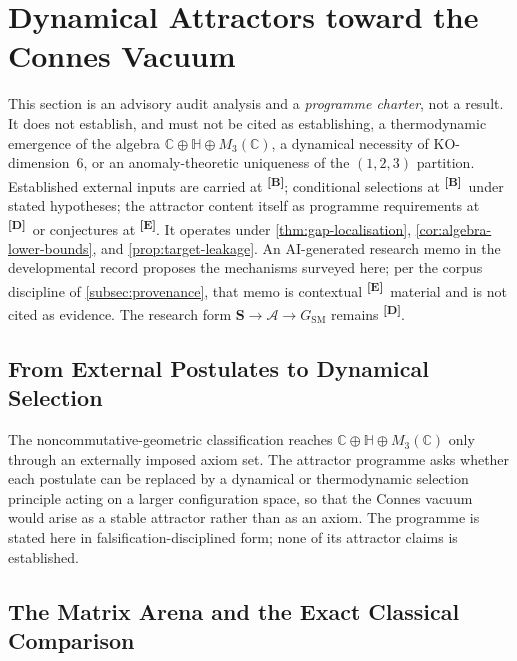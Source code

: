 \documentclass[12pt,a4paper,twoside]{article}
\theoremstyle{plain}
\theoremstyle{definition}
\theoremstyle{remark}
\newcommand{\catmark}[1]{\textsuperscript{\textsf{\textbf{[#1]}}}}
\begin{document}
\newpage
\section{Dynamical Attractors toward the Connes Vacuum}
\label{sec:connes-attractor}

\begin{governancebox}
This section is an advisory audit analysis and a \emph{programme
charter}, not a result. It does not establish, and must not be cited as
establishing, a thermodynamic emergence of the algebra
$\mathbb{C}\oplus\mathbb{H}\oplus M_3(\mathbb{C})$, a dynamical necessity
of KO-dimension~6, or an anomaly-theoretic uniqueness of the $(1,2,3)$
partition. Established external inputs are carried at \catmark{B};
conditional selections at \catmark{B}\ under stated hypotheses; the
attractor content itself as programme requirements at \catmark{D}\ or
conjectures at \catmark{E}. It operates under
\cref{thm:gap-localisation}, \cref{cor:algebra-lower-bounds}, and
\cref{prop:target-leakage}. An AI-generated research memo in the
developmental record proposes the mechanisms surveyed here; per the
corpus discipline of \cref{subsec:provenance}, that memo is contextual
\catmark{E}\ material and is not cited as evidence. The research form
$\mathbf S \to \mathcal A \to G_{\mathrm{SM}}$ remains \catmark{D}.
\end{governancebox}

\subsection{From External Postulates to Dynamical Selection}
\label{subsec:attractor-programme}

The noncommutative-geometric classification reaches
$\mathbb{C}\oplus\mathbb{H}\oplus M_3(\mathbb{C})$ only through an
externally imposed axiom set. The attractor programme asks whether each
postulate can be replaced by a dynamical or thermodynamic selection
principle acting on a larger configuration space, so that the Connes
vacuum would arise as a stable attractor rather than as an axiom. The
programme is stated here in falsification-disciplined form; none of its
attractor claims is established.

\subsection{The Matrix Arena and the Exact Classical Comparison}
\label{subsec:matrix-arena}
\end{document}

